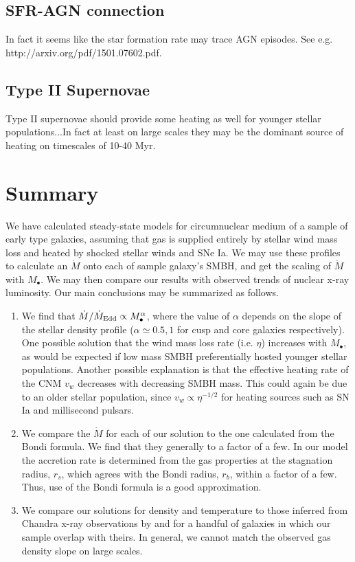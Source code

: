\documentclass[usenatbib,fleqn]{mn2e}
\newcommand{\Mdot}{\dot{M}}
\newcommand{\eddr}{\dot{M}/\dot{M}_{\rm Edd}}
\newcommand{\rs}{r_s}
\newcommand{\rb}{r_b}
\newcommand{\Mbh}[1][]{M_{\bullet#1}}
\begin{document}
\subsection{SFR-AGN connection}
In fact it seems like the star formation rate may trace AGN
episodes. See e.g. http://arxiv.org/pdf/1501.07602.pdf. 

\subsection{Type II Supernovae}
Type II supernovae should provide some heating as well for younger
stellar populations...In fact at least on large scales they may be the
dominant source of heating on timescales of 10-40 Myr. 
  

  \section{Summary}
  \label{sec:summary}
  We have calculated steady-state models for circumnuclear medium of a
  sample of early type galaxies, assuming that gas is supplied
  entirely by stellar wind mass loss and heated by shocked stellar
  winds and SNe Ia. We may use these profiles to calculate an $\Mdot$
  onto each of sample galaxy's SMBH, and get the scaling of $\Mdot$
  with $\Mbh$. We may then compare our results with observed trends of
  nuclear x-ray luminosity. Our main conclusions may be summarized as
  follows.

  \begin{enumerate}
  \item We find that $\eddr \propto \Mbh^{\alpha}$, where the value of
    $\alpha$ depends on the slope of the stellar density profile
    ($\alpha\simeq0.5,1$ for cusp and core galaxies respectively). One
    possible solution that the wind mass loss rate (i.e. $\eta$)
    increases with $\Mbh$, as would be expected if low mass SMBH
    preferentially hosted younger stellar populations. Another possible
    explanation is that the effective heating rate of the CNM $v_{w}$
    decreases with decreasing SMBH mass. This could again be due to an
    older stellar population, since $v_{w} \propto \eta^{−1/2}$
    for heating sources such as SN Ia and millisecond pulsars.
  \item We compare the $\Mdot$ for each of our solution to the one
    calculated from the Bondi formula. We find that they generally to
    a factor of a few. In our model the accretion rate is determined
    from the gas properties at the stagnation radius, $\rs$, which
    agrees with the Bondi radius, $\rb$, within a factor of a
    few. Thus, use of the Bondi formula is a good approximation.
  \item We compare our solutions for density and temperature to those
    inferred from Chandra x-ray observations by \citet{AllenDunn+:2006a}
    and \citet{RussellMcNamara+:2013a} for a handful of galaxies in
    which our sample overlap with theirs. In general, we cannot match
    the observed gas density slope on large scales. 
  \end{enumerate}
  
\end{document}
